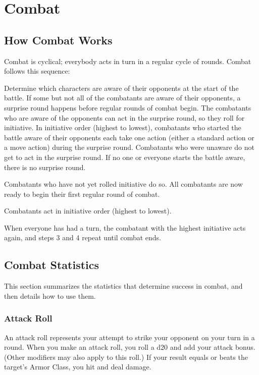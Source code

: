 \chapter{Combat}

\section{How Combat Works}
Combat is cyclical; everybody acts in turn in a regular cycle of rounds. Combat follows this sequence:
\begin{enumerate*}
\item Determine which characters are aware of their opponents at the start of the battle. If some but not all of the combatants are aware of their opponents, a surprise round happens before regular rounds of combat begin. The combatants who are aware of the opponents can act in the surprise round, so they roll for initiative. In initiative order (highest to lowest), combatants who started the battle aware of their opponents each take one action (either a standard action or a move action) during the surprise round. Combatants who were unaware do not get to act in the surprise round. If no one or everyone starts the battle aware, there is no surprise round.
\item Combatants who have not yet rolled initiative do so. All combatants are now ready to begin their first regular round of combat.
\item Combatants act in initiative order (highest to lowest).
\item When everyone has had a turn, the combatant with the highest initiative acts again, and steps 3 and 4 repeat until combat ends.
\end{enumerate*}

\section{Combat Statistics}
This section summarizes the statistics that determine success in combat, and then details how to use them.

\subsection{Attack Roll}
An attack roll represents your attempt to strike your opponent on your turn in a round. When you make an attack roll, you roll a d20 and add your attack bonus. (Other modifiers may also apply to this roll.) If your result equals or beats the target's Armor Class, you hit and deal damage.

